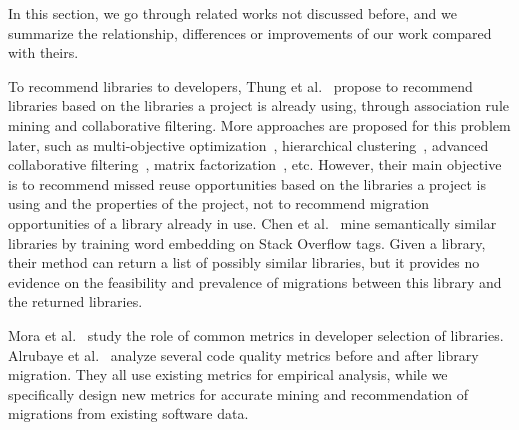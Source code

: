\documentclass[conference, 10pt]{IEEEtran}
\begin{document}
In this section, we go through related works not discussed before, and we summarize the relationship, differences or improvements of our work compared with theirs.


To recommend libraries to developers, Thung et al.~\cite{2013WCRE-Thung-Automated} propose to recommend libraries based on the libraries a project is already using, through association rule mining and collaborative filtering.
More approaches are proposed for this problem later, such as multi-objective optimization~\cite{2017InfoSciAndTech-Ouni-Search},  hierarchical clustering~\cite{2018JSS-Saied-Improving}, advanced collaborative filtering~\cite{2020JSS-Nguyen-CrossRec}, matrix factorization~\cite{2020TSE-He-Diversified}, etc. 
However, their main objective is to recommend missed reuse opportunities based on the libraries a project is using and the properties of the project, not to recommend migration opportunities of a library already in use. 
Chen et al.~\cite{2016SANER-Chen-Mining} mine semantically similar libraries by training word embedding on Stack Overflow tags. Given a library, their method can return a list of possibly similar libraries, but it provides no evidence on the feasibility and prevalence of migrations between this library and the returned libraries.

Mora et al.~\cite{2018PROMISE-Mora-An} study the role of common metrics in developer selection of libraries. Alrubaye et al.~\cite{2019Arxiv-Alrubaye-How} analyze several code quality metrics before and after library migration. They all use existing metrics for empirical analysis, while we specifically design new metrics for accurate mining and recommendation of migrations from existing software data.
\end{document}

